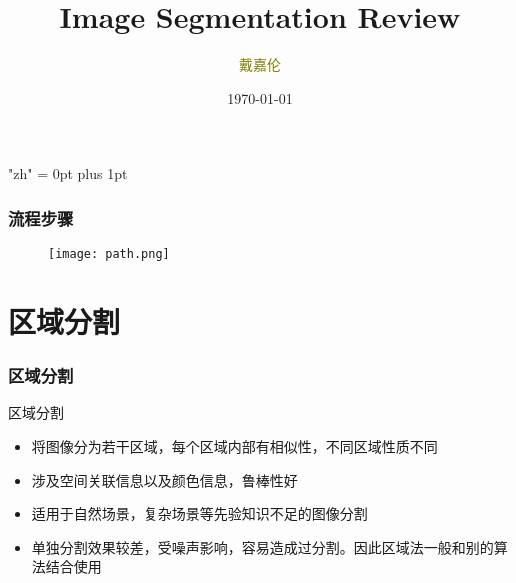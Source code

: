 \documentclass[notheorems,mathserif,table,compress]{beamer}  %
\begin{document}
\XeTeXlinebreaklocale "zh"         %
\XeTeXlinebreakskip = 0pt plus 1pt %
\begin{comment}
\AtBeginSection[]{                              %
  \frame<handout:0>{
    \frametitle{Content}\small
    \tableofcontents[current,currentsubsection]
  }
}
\AtBeginSubsection[]                            %
{
  \frame<handout:0>                             %
  {
    \frametitle{下一节内容}\small
    \tableofcontents[current,currentsubsection] %
  }
}
\end{comment}
\title[]{Image Segmentation Review}
\author[戴嘉伦]{\textcolor{olive}{戴嘉伦}}
\institute[中国海洋大学]{\small\textcolor{violet}{中国海洋大学}}
\date{\today}
\frame{ \titlepage }


\begin{frame}
  \frametitle{流程步骤}
   \begin{figure}[!ht]
   \centering
   \texttt{[image: path.png]}
   \end{figure}
\end{frame}

\section{区域分割}
\begin{frame}
  \frametitle{区域分割}
   区域分割
   \begin{itemize}
   \item 将图像分为若干区域，每个区域内部有相似性，不同区域性质不同
   \item 涉及空间关联信息以及颜色信息，鲁棒性好
   \item 适用于自然场景，复杂场景等先验知识不足的图像分割 
   \item 单独分割效果较差，受噪声影响，容易造成过分割。因此区域法一般和别的算法结合使用
   \end{itemize}
\end{frame}
\end{document}
